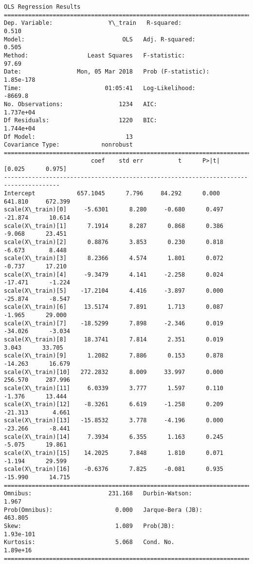 \documentclass[11pt]{article}
\begin{document}
    \begin{Verbatim}[commandchars=\\\{\}]
                            OLS Regression Results                            
==============================================================================
Dep. Variable:                Y\_train   R-squared:                       0.510
Model:                            OLS   Adj. R-squared:                  0.505
Method:                 Least Squares   F-statistic:                     97.69
Date:                Mon, 05 Mar 2018   Prob (F-statistic):          1.85e-178
Time:                        01:05:41   Log-Likelihood:                -8669.8
No. Observations:                1234   AIC:                         1.737e+04
Df Residuals:                    1220   BIC:                         1.744e+04
Df Model:                          13                                         
Covariance Type:            nonrobust                                         
======================================================================================
                         coef    std err          t      P>|t|      [0.025      0.975]
--------------------------------------------------------------------------------------
Intercept            657.1045      7.796     84.292      0.000     641.810     672.399
scale(X\_train)[0]     -5.6301      8.280     -0.680      0.497     -21.874      10.614
scale(X\_train)[1]      7.1914      8.287      0.868      0.386      -9.068      23.451
scale(X\_train)[2]      0.8876      3.853      0.230      0.818      -6.673       8.448
scale(X\_train)[3]      8.2366      4.574      1.801      0.072      -0.737      17.210
scale(X\_train)[4]     -9.3479      4.141     -2.258      0.024     -17.471      -1.224
scale(X\_train)[5]    -17.2104      4.416     -3.897      0.000     -25.874      -8.547
scale(X\_train)[6]     13.5174      7.891      1.713      0.087      -1.965      29.000
scale(X\_train)[7]    -18.5299      7.898     -2.346      0.019     -34.026      -3.034
scale(X\_train)[8]     18.3741      7.814      2.351      0.019       3.043      33.705
scale(X\_train)[9]      1.2082      7.886      0.153      0.878     -14.263      16.679
scale(X\_train)[10]   272.2832      8.009     33.997      0.000     256.570     287.996
scale(X\_train)[11]     6.0339      3.777      1.597      0.110      -1.376      13.444
scale(X\_train)[12]    -8.3261      6.619     -1.258      0.209     -21.313       4.661
scale(X\_train)[13]   -15.8532      3.778     -4.196      0.000     -23.266      -8.441
scale(X\_train)[14]     7.3934      6.355      1.163      0.245      -5.075      19.861
scale(X\_train)[15]    14.2025      7.848      1.810      0.071      -1.194      29.599
scale(X\_train)[16]    -0.6376      7.825     -0.081      0.935     -15.990      14.715
==============================================================================
Omnibus:                      231.168   Durbin-Watson:                   1.967
Prob(Omnibus):                  0.000   Jarque-Bera (JB):              463.805
Skew:                           1.089   Prob(JB):                    1.93e-101
Kurtosis:                       5.068   Cond. No.                     1.89e+16
==============================================================================


\end{Verbatim}
\end{document}

